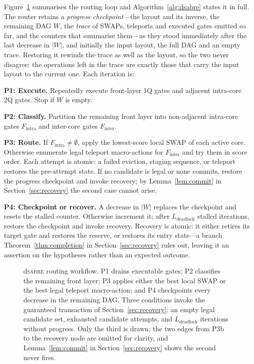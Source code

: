 \documentclass[journal]{IEEEtran}
\newcommand{\dSABRE}{d\textsc{sabre}}
\begin{document}
Figure~\ref{fig:workflow} summarises the routing loop and Algorithm~\ref{alg:dsabre} states it in full.  The router retains a \emph{progress checkpoint}---the layout and its inverse, the remaining DAG $W$, the \emph{trace} of SWAPs, teleports and executed gates emitted so far, and the counters that summarise them---as they stood immediately after the last decrease in $|W|$, and initially the input layout, the full DAG and an empty trace.  Restoring it rewinds the trace as well as the layout, so the two never disagree: the operations left in the trace are exactly those that carry the input layout to the current one.  Each iteration is:

\textbf{P1: Execute.} Repeatedly execute front-layer 1Q gates and adjacent intra-core 2Q gates. Stop if $W$ is empty.

\textbf{P2: Classify.} Partition the remaining front layer into non-adjacent intra-core gates $F_{\mathrm{intra}}$ and inter-core gates $F_{\mathrm{inter}}$.

\textbf{P3: Route.} If $F_{\mathrm{intra}}\neq\emptyset$, apply the lowest-score local SWAP of each active core. Otherwise enumerate legal teleport macro-actions for $F_{\mathrm{inter}}$ and try them in score order. Each attempt is atomic: a failed eviction, staging sequence, or teleport restores the pre-attempt state. If no candidate is legal or none commits, restore the progress checkpoint and invoke recovery; by Lemma~\ref{lem:commit} in Section~\ref{sec:recovery} the second case cannot arise.

\textbf{P4: Checkpoint or recover.} A decrease in $|W|$ replaces the checkpoint and resets the stalled counter. Otherwise increment it; after $L_{\mathrm{deadlock}}$ stalled iterations, restore the checkpoint and invoke recovery. Recovery is atomic: it either retires its target gate and restores the reserve, or restores its entry state---a branch Theorem~\ref{thm:completion} in Section~\ref{sec:recovery} rules out, leaving it an assertion on the hypotheses rather than an expected outcome.

\begin{figure}[t]
\centering
\resizebox{\columnwidth}{!}{}
\caption{\dSABRE{} routing workflow. P1 drains executable gates; P2
classifies the remaining front layer; P3 applies either the best local SWAP
or the best legal teleport macro-action; and P4 checkpoints every decrease in
the remaining DAG. Three conditions invoke the guaranteed transaction of
Section~\ref{sec:recovery}: an empty legal candidate set, exhausted candidate
attempts, and $L_{\mathrm{deadlock}}$ iterations without progress. Only the
third is drawn; the two edges from P3b to the recovery node are omitted for
clarity, and Lemma~\ref{lem:commit} in Section~\ref{sec:recovery} shows the second never fires.}
\label{fig:workflow}
\end{figure}
\end{document}
